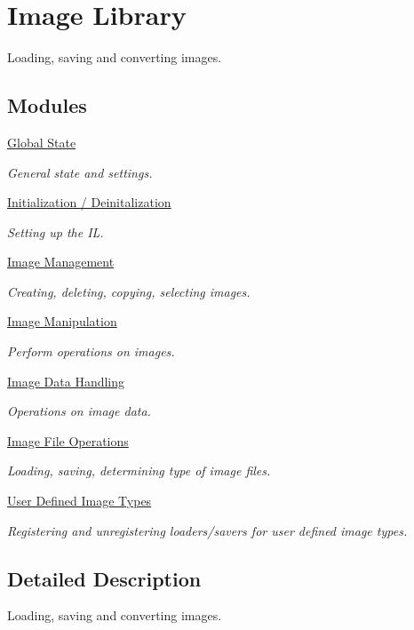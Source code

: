 \hypertarget{group___i_l}{\section{Image Library}
\label{group___i_l}
}


Loading, saving and converting images.  


\subsection*{Modules}
\begin{DoxyCompactItemize}
\item 
\hyperlink{group__state}{Global State}
\begin{DoxyCompactList}\small\item\em General state and settings. \end{DoxyCompactList}\item 
\hyperlink{group__setup}{Initialization / Deinitalization}
\begin{DoxyCompactList}\small\item\em Setting up the I\+L. \end{DoxyCompactList}\item 
\hyperlink{group__image__mgt}{Image Management}
\begin{DoxyCompactList}\small\item\em Creating, deleting, copying, selecting images. \end{DoxyCompactList}\item 
\hyperlink{group__image__manip}{Image Manipulation}
\begin{DoxyCompactList}\small\item\em Perform operations on images. \end{DoxyCompactList}\item 
\hyperlink{group__data}{Image Data Handling}
\begin{DoxyCompactList}\small\item\em Operations on image data. \end{DoxyCompactList}\item 
\hyperlink{group__file}{Image File Operations}
\begin{DoxyCompactList}\small\item\em Loading, saving, determining type of image files. \end{DoxyCompactList}\item 
\hyperlink{group__register}{User Defined Image Types}
\begin{DoxyCompactList}\small\item\em Registering and unregistering loaders/savers for user defined image types. \end{DoxyCompactList}\end{DoxyCompactItemize}


\subsection{Detailed Description}
Loading, saving and converting images. 

